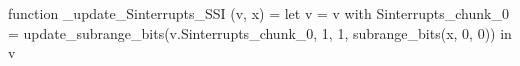 function _update_Sinterrupts_SSI (v, x) = let v = { v with Sinterrupts_chunk_0 = update_subrange_bits(v.Sinterrupts_chunk_0, 1, 1, subrange_bits(x, 0, 0)) } in
  v
